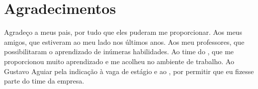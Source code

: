 \chapter*{Agradecimentos}

Agradeço a meus pais, por tudo que eles puderam me proporcionar. Aos meus amigos, que estiveram ao meu lado nos últimos anos. Aos meu professores, que possibilitaram o aprendizado de inúmeras habilidades. Ao time do \nomeEmpresa, que me proporcionou muito aprendizado e me acolheu no ambiente de trabalho. Ao Gustavo Aguiar pela indicação à vaga de estágio e ao \nomeSupervisor, por permitir que eu fizesse parte do time da empresa.
